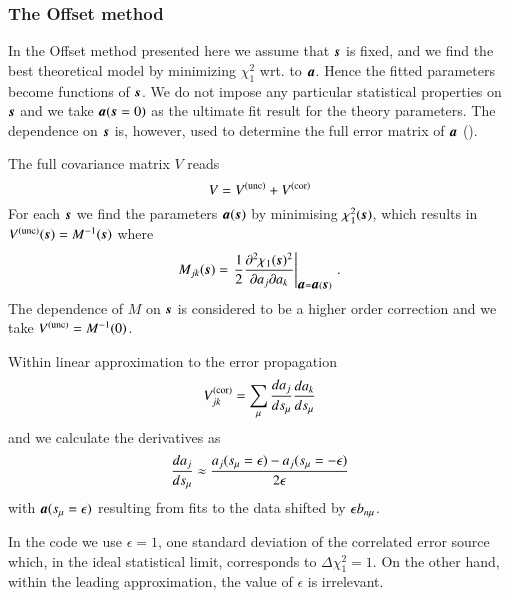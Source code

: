 \subsubsection{The Offset method}

In the Offset method presented here we assume that $\mb\rs$ is fixed, 
and we find the best theoretical model by minimizing
$\chi_1^2$ wrt. to $\mb a$. 
Hence the fitted parameters become functions
of $\mb\rs$. %
We do not impose any particular statistical properties on $\mb\rs$ 
and we take $\mb a(\mb\rs=0)$ as the ultimate fit result for the theory parameters. 
The dependence on $\mb\rs$ is, however, used to determine
the full error matrix of $\mb a$ (\cf \cite{Pascaud:1995qs}).

The full covariance matrix $V$ reads
\begin{equation}
\label{eq:Cv-full}
V = \Vstat + \Vsys
\end{equation}
For each $\mb\rs$ we find the parameters $\mb a(\mb \rs)$ by minimising $\chi_1^2(\mb \rs)$, which results in
$\Vstat(\mb \rs) = M^{-1}(\mb \rs)$ where
\begin{equation}
M_{jk}(\mb \rs)
= \left.
{\frac12} \frac{\partial^2\chi_1(\mb \rs)^2}{\partial a_j \partial a_k}\right\vert_{\mb a = \mb a(\mb \rs)}
\,.
\end{equation}
The dependence of $M$ on $\mb \rs$ is considered to be a higher order correction
and we take $\Vstat = M^{-1}(0)$.

Within linear approximation to the error propagation
\begin{equation}
\label{eq:Vsysp}
\Vsys_{jk} = \sum_\mu \frac{da_j}{d\rs_\mu} \frac{da_k}{d\rs_\mu}
\end{equation} 
and we calculate the derivatives as
\begin{equation}
\frac{da_j}{ds_\mu} \approx
\frac{a_j(s_\mu=\epsilon) - a_j(s_\mu=-\epsilon)}{2\epsilon}
\end{equation}
with $\mb a(\rs_\mu=\epsilon)$ resulting from
fits to the data shifted by $\epsilon b_{n\mu}$.

In the code we use $\epsilon=1$, \ie one standard deviation of
the correlated error source which, in the ideal statistical limit, corresponds to 
$\Delta\chi_1^2 = 1$.
On the other hand, within the leading approximation, the value of $\epsilon$ is irrelevant.

